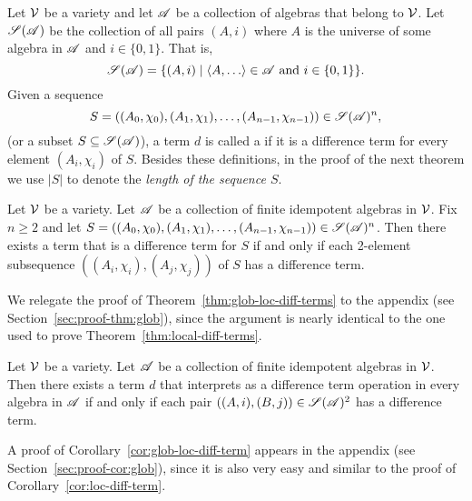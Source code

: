 Let $\mathcal{V}$ be a variety and let $\mathscr{A}$ be a collection of algebras that belong to $\mathcal{V}$.
Let $\mathscr{S}(\mathscr{A})$ be the collection of all pairs $(A, i)$ where $A$ is the universe
of some algebra in $\mathscr{A}$ and $i\in \{0,1\}$.  That is,
\[
\scS(\scA) = \{(A, i) \mid \<A, \dots\> \in \scA \text{ and } i \in \{0,1\}\}.
\]
Given a sequence
\[S = ((A_0, \chi_0), (A_1, \chi_1), \dots,
(A_{n-1},\chi_{n-1})) \in \mathscr{S}(\mathscr{A})^n,
\]
(or a subset $S \subseteq \mathscr{S}(\mathscr{A})$),
a term $d$ is called a 
if it is a \glocal difference term for every element $(A_i, \chi_i)$ of $S$.
Besides these definitions, in the proof of the next theorem we use
$|S|$ to denote the \emph{length of the sequence $S$}.
\begin{thm}
  \label{thm:glob-loc-diff-terms}
  Let $\mathcal{V}$ be a variety.  Let $\mathscr{A}$ be a collection of finite idempotent
  algebras in $\mathcal{V}$. Fix $n\geq 2$ and 
  let $S= ((A_0, \chi_0), (A_1, \chi_1), \dots, (A_{n-1}, \chi_{n-1}))\in \mathscr{S}(\mathscr{A})^n$.
  Then there exists a term that is a \glocal difference term for $S$
  if and only if each 2-element subsequence $((A_i,\chi_i), (A_j,\chi_j))$ of $S$
  has a \glocal difference term.
\end{thm}
We relegate the proof of Theorem~\ref{thm:glob-loc-diff-terms} 
to the appendix (see Section~\ref{sec:proof-thm:glob}), since the argument 
is nearly identical to the one used to prove Theorem~\ref{thm:local-diff-terms}. 

\begin{cor}
  \label{cor:glob-loc-diff-term}
  Let $\mathcal{V}$ be a variety.  Let $\mathscr{A}$ be a collection of finite idempotent
  algebras in $\mathcal{V}$. %
  Then there exists a term $d$ that interprets as a difference term operation
  in every algebra in $\mathscr{A}$
  if and only if each pair $((A,i), (B,j)) \in \mathscr{S}(\mathscr{A})^2$ has a \glocal
  difference term.
\end{cor}
A proof of Corollary~\ref{cor:glob-loc-diff-term}
appears in the appendix (see Section~\ref{sec:proof-cor:glob}),
since it is also very easy and similar to the proof
of Corollary~\ref{cor:loc-diff-term}.

